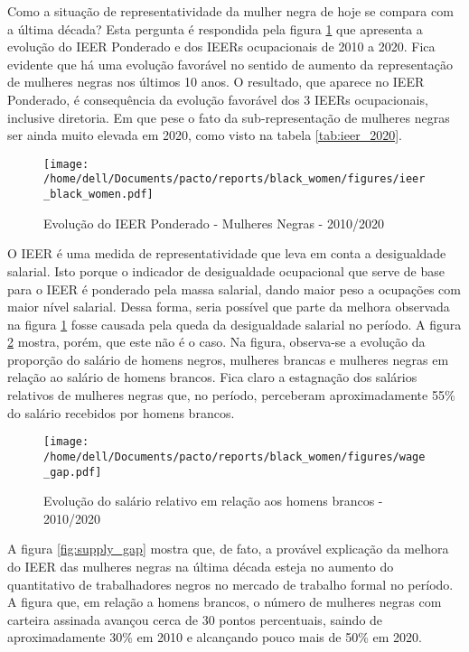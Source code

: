 \documentclass[12pt]{article}
\begin{document}
\par Como a situação de representatividade da mulher negra de hoje se compara com a última década? Esta pergunta é respondida pela figura \ref{fig:ieer_evolution} que apresenta a evolução do IEER Ponderado e dos IEERs ocupacionais de 2010 a 2020. Fica evidente que há uma evolução favorável no sentido de aumento da representação de mulheres negras nos últimos 10 anos. O resultado, que aparece no IEER Ponderado, é consequência da evolução favorável dos 3 IEERs ocupacionais, inclusive diretoria. Em que pese o fato da sub-representação de mulheres negras ser ainda muito elevada em 2020, como visto na tabela \ref{tab:ieer_2020}.

\begin{figure}[H]
    \centering
    \caption{Evolução do IEER Ponderado - Mulheres Negras - 2010/2020}
        \texttt{[image: /home/dell/Documents/pacto/reports/black\_women/figures/ieer\_black\_women.pdf]}
    \label{fig:ieer_evolution}
\end{figure}

\par O IEER é uma medida de representatividade que leva em conta a desigualdade salarial. Isto porque o indicador de desigualdade ocupacional que serve de base para o IEER é ponderado pela massa salarial, dando maior peso a ocupações com maior nível salarial. Dessa forma, seria possível que parte da melhora observada na figura \ref{fig:ieer_evolution} fosse causada pela queda da desigualdade salarial no período. A figura \ref{fig:wage_gap} mostra, porém, que este não é o caso. Na figura, observa-se a evolução da proporção do salário de homens negros, mulheres brancas e mulheres negras em relação ao salário de homens brancos. Fica claro a estagnação dos salários relativos de mulheres negras que, no período, perceberam aproximadamente 55\% do salário recebidos por homens brancos.

\begin{figure}[H]
    \centering
    \caption{Evolução do salário relativo em relação aos homens brancos - 2010/2020}
        \texttt{[image: /home/dell/Documents/pacto/reports/black\_women/figures/wage\_gap.pdf]}
    \label{fig:wage_gap}
\end{figure}

\par A figura \ref{fig:supply_gap} mostra que, de fato, a provável explicação da melhora do IEER das mulheres negras na última década esteja no aumento do quantitativo de trabalhadores negros no mercado de trabalho formal no período. A figura que, em relação a homens brancos, o número de mulheres negras com carteira assinada avançou cerca de 30 pontos percentuais, saindo de aproximadamente 30\% em 2010 e alcançando pouco mais de 50\% em 2020.
\end{document}
